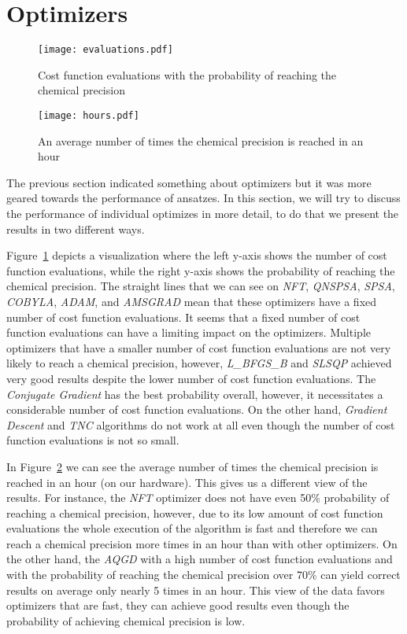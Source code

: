 \section{Optimizers}
\begin{figure}[H]
    \centering
    \texttt{[image: evaluations.pdf]}
    \caption{Cost function evaluations with the probability of reaching the chemical precision}
    \label{fig:evaluations}
\end{figure}

\begin{figure}[H]
    \centering
    \texttt{[image: hours.pdf]}
    \caption{An average number of times the chemical precision is reached in an hour}
    \label{fig:hours}
\end{figure}

The previous section indicated something about optimizers but it was more geared towards the performance of ansatzes. In this section, we will try to discuss the performance of individual optimizes in more detail, to do that we present the results in two different ways.

Figure~\ref{fig:evaluations} depicts a visualization where the left y-axis shows the number of cost function evaluations, while the right y-axis shows the probability of reaching the chemical precision. The straight lines that we can see on \textit{NFT}, \textit{QNSPSA}, \textit{SPSA}, \textit{COBYLA}, \textit{ADAM}, and \textit{AMSGRAD} mean that these optimizers have a fixed number of cost function evaluations. It seems that a fixed number of cost function evaluations can have a limiting impact on the optimizers. Multiple optimizers that have a smaller number of cost function evaluations are not very likely to reach a chemical precision, however, \textit{L\_BFGS\_B} and \textit{SLSQP} achieved very good results despite the lower number of cost function evaluations. The \textit{Conjugate Gradient} has the best probability overall, however, it necessitates a considerable number of cost function evaluations. On the other hand, \textit{Gradient Descent} and \textit{TNC} algorithms do not work at all even though the number of cost function evaluations is not so small.

In Figure~\ref{fig:hours} we can see the average number of times the chemical precision is reached in an hour (on our hardware). This gives us a different view of the results. For instance, the \textit{NFT} optimizer does not have even 50\% probability of reaching a chemical precision, however, due to its low amount of cost function evaluations the whole execution of the algorithm is fast and therefore we can reach a chemical precision more times in an hour than with other optimizers. On the other hand, the \textit{AQGD} with a high number of cost function evaluations and with the probability of reaching the chemical precision over 70\% can yield correct results on average only nearly 5 times in an hour. This view of the data favors optimizers that are fast, they can achieve good results even though the probability of achieving chemical precision is low.

